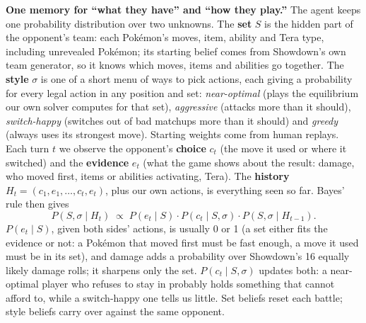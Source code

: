 \documentclass[10pt]{article}
\begin{document}
\textbf{One memory for ``what they have'' and ``how they play.''} The agent keeps one probability distribution over two unknowns. The \textbf{set} $S$ is the hidden part of the opponent's team: each Pok\'emon's moves, item, ability and Tera type, including unrevealed Pok\'emon; its starting belief comes from Showdown's own team generator, so it knows which moves, items and abilities go together. The \textbf{style} $\sigma$ is one of a short menu of ways to pick actions, each giving a probability for every legal action in any position and set: \emph{near-optimal} (plays the equilibrium our own solver computes for that set), \emph{aggressive} (attacks more than it should), \emph{switch-happy} (switches out of bad matchups more than it should) and \emph{greedy} (always uses its strongest move). Starting weights come from human replays.
Each turn $t$ we observe the opponent's \textbf{choice} $c_t$ (the move it used or where it switched) and the \textbf{evidence} $e_t$ (what the game shows about the result: damage, who moved first, items or abilities activating, Tera). The \textbf{history} $H_t=(c_1,e_1,\dots,c_t,e_t)$, plus our own actions, is everything seen so far. Bayes' rule then gives
\[ P(S,\sigma\mid H_t)\;\propto\;P(e_t\mid S)\cdot P(c_t\mid S,\sigma)\cdot P(S,\sigma\mid H_{t-1}). \]
$P(e_t\mid S)$, given both sides' actions, is usually 0 or 1 (a set either fits the evidence or not: a Pok\'emon that moved first must be fast enough, a move it used must be in its set), and damage adds a probability over Showdown's 16 equally likely damage rolls; it sharpens only the set. $P(c_t\mid S,\sigma)$ updates both: a near-optimal player who refuses to stay in probably holds something that cannot afford to, while a switch-happy one tells us little. Set beliefs reset each battle; style beliefs carry over against the same opponent.
\end{document}
